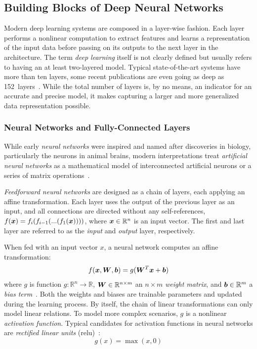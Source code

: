 \subsection{Building Blocks of Deep Neural Networks}
Modern deep learning systems are composed in a layer-wise fashion. Each layer performs a nonlinear computation to extract features and learns a representation of the input data before passing on its outputs to the next layer in the architecture. The term \emph{deep learning} itself is not clearly defined but usually refers to having an at least two-layered model. Typical state-of-the-art systems have more than ten layers, some recent publications are even going as deep as \num{152}~layers~\cite{he2016deep}. While the total number of layers is, by no means, an indicator for an accurate and precise model, it makes capturing a larger and more generalized data representation possible.

\subsubsection{Neural Networks and Fully-Connected Layers}
While early \emph{neural networks} were inspired and named after discoveries in biology, particularly the neurons in animal brains, modern interpretations treat \emph{artificial neural networks} as a mathematical model of interconnected artificial neurons or a series of matrix operations~\cite{mcculloch1943logical, rosenblatt1958perceptron}.

\emph{Feedforward neural networks} are designed as a chain of layers, each applying an affine transformation. Each layer uses the output of the previous layer as an input, and all connections are directed without any self-references, $ f(\boldsymbol{x}) = f_i(f_{i-1}(...(f_1(\boldsymbol{x})))) $, where $\boldsymbol{x} \in \mathbb{R}^n $ is an input vector. The first and last layer are referred to as the \emph{input} and \emph{output} layer, respectively.

When fed with an input vector $x$, a neural network computes an affine transformation:
$$
f(\boldsymbol{x}, \boldsymbol{W}, \boldsymbol{b}) = g(\boldsymbol{W}^T\boldsymbol{x} + \boldsymbol{b})
$$
where $g$ is function $g: \mathbb{R}^n \rightarrow \mathbb{R}$, $\boldsymbol{W} \in\mathbb{R}^{n \times m} $ an $n \times m$ \emph{weight matrix}, and $\boldsymbol{b} \in\mathbb{R}^m $ a \emph{bias term}~\cite[p.~192]{Goodfellow-et-al-2016}. Both the weights and biases are trainable parameters and updated during the learning process. By itself, the chain of linear transformations can only model linear relations. To model more complex scenarios, $g$ is a nonlinear \emph{activation function}. Typical candidates for activation functions in neural networks are \emph{rectified linear units} (\ac{relu})~\cite{nair2010rectified}:
$$
g(x) = \operatorname{max}(x, 0)
$$

